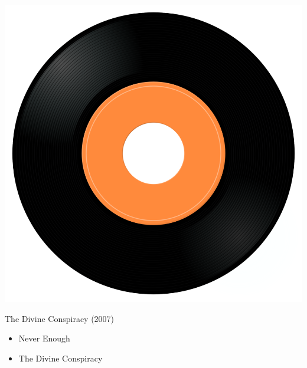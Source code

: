 \begin{minipage}[t]{0.25\textwidth}
\captionsetup{type=figure}
\includegraphics[width=\textwidth]{Images/cover.png}
\caption*{The Divine Conspiracy (2007)}
\end{minipage}
\begin{minipage}[t]{0.25\textwidth}\vspace{0pt}
\begin{itemize}[nosep,leftmargin=1em,labelwidth=*,align=left]
	\setlength{\itemsep}{0pt}
	\item Never Enough
	\item The Divine Conspiracy
\end{itemize}
\end{minipage}

